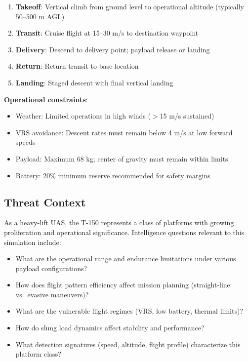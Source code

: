 \begin{enumerate}
	\item \unclass \textbf{Takeoff}: Vertical climb from ground level to operational altitude (typically 50--500 m AGL)
	\item \unclass \textbf{Transit}: Cruise flight at 15--30 m/s to destination waypoint
	\item \unclass \textbf{Delivery}: Descend to delivery point; payload release or landing
	\item \unclass \textbf{Return}: Return transit to base location
	\item \unclass \textbf{Landing}: Staged descent with final vertical landing
\end{enumerate}

\unclass \textbf{Operational constraints}:
\begin{itemize}
	\item \unclass Weather: Limited operations in high winds ($>$15 m/s sustained)
	\item \unclass VRS avoidance: Descent rates must remain below 4 m/s at low forward speeds
	\item \unclass Payload: Maximum 68 kg; center of gravity must remain within limits
	\item \unclass Battery: 20\% minimum reserve recommended for safety margins
\end{itemize}

\subsection{\unclass Threat Context}\label{sec:ThreatContext}

\unclass As a heavy-lift UAS, the T-150 represents a class of platforms with growing proliferation and operational significance. Intelligence questions relevant to this simulation include:

\begin{itemize}
	\item \unclass What are the operational range and endurance limitations under various payload configurations?
	\item \unclass How does flight pattern efficiency affect mission planning (straight-line vs.\ evasive maneuvers)?
	\item \unclass What are the vulnerable flight regimes (VRS, low battery, thermal limits)?
	\item \unclass How do slung load dynamics affect stability and performance?
	\item \unclass What detection signatures (speed, altitude, flight profile) characterize this platform class?
\end{itemize}

